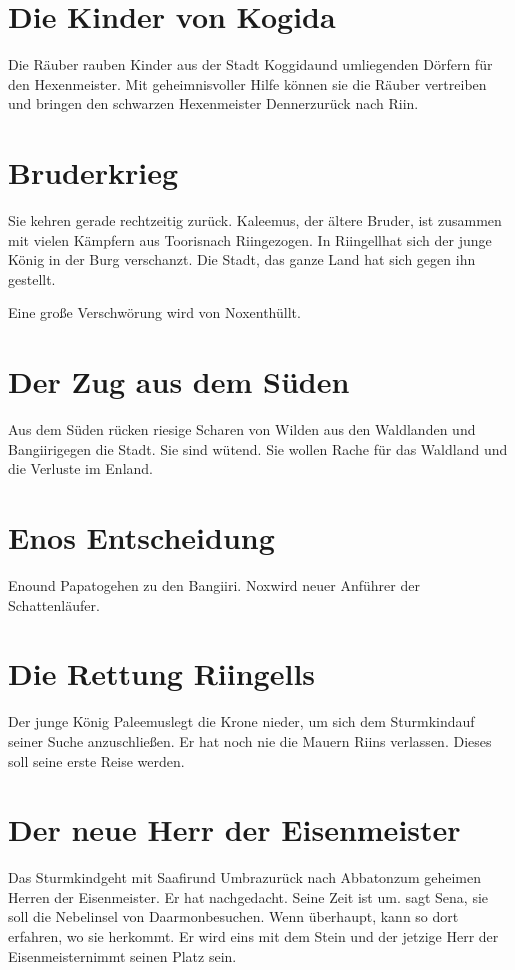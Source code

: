 \documentclass[12pt,a4paper,onecolumn,twoside,ngerman]{book}
\newcommand{\Sena}{Sena}
\newcommand{\Sturmkind}{Sturmkind}
\newcommand{\Bangiri}{Bangiiri}
\newcommand{\Papato}{Papato}
\newcommand{\Enland}{Enland}
\newcommand{\Schattenlaufer}{Schattenläufer}
\newcommand{\Eno}{Eno}
\newcommand{\Nox}{Nox}
\newcommand{\Umbra}{Umbra}
\newcommand{\Rhingell}{Riingell}
\newcommand{\Rhin}{Riin}
\newcommand{\Palemus}{Paleemus}
\newcommand{\Kalemus}{Kaleemus}
\newcommand{\Kogida}{Koggida}
\newcommand{\Denner}{Denner}
\newcommand{\Toris}{Tooris}
\newcommand{\Darmon}{Daarmon}
\newcommand{\Eisenmeister}{Eisenmeister}
\newcommand{\Abaton}{Abbaton}
\newcommand{\Safir}{Saafir}
\begin{document}
\section{Die Kinder von Kogida}
Die Räuber rauben Kinder aus der Stadt \Kogida und umliegenden Dörfern für den Hexenmeister. Mit geheimnisvoller Hilfe können sie die Räuber vertreiben und bringen den schwarzen Hexenmeister \Denner zurück nach \Rhin .

\section{Bruderkrieg}
Sie kehren gerade rechtzeitig zurück. \Kalemus , der ältere Bruder, ist zusammen mit vielen Kämpfern aus \Toris nach \Rhin gezogen. In \Rhingell hat sich der junge König in der Burg verschanzt. Die Stadt, das ganze Land hat sich gegen ihn gestellt. 

Eine große Verschwörung wird von \Nox enthüllt.

\section{Der Zug aus dem Süden}
Aus dem Süden rücken riesige Scharen von Wilden aus den Waldlanden und \Bangiri gegen die Stadt. Sie sind wütend. Sie wollen Rache für das Waldland und die Verluste im \Enland .

\section{{\Eno}s Entscheidung}
\Eno und \Papato gehen zu den \Bangiri . \Nox wird neuer Anführer der \Schattenlaufer .

\section{Die Rettung \Rhingell{s}}
Der junge König \Palemus legt die Krone nieder, um sich dem \Sturmkind auf seiner Suche anzuschließen. Er hat noch nie die Mauern \Rhin{s} verlassen. Dieses soll seine erste Reise werden.

\section{Der neue Herr der \Eisenmeister}
Das \Sturmkind geht mit \Safir und \Umbra zurück nach \Abaton zum geheimen Herren der \Eisenmeister . Er hat nachgedacht. Seine Zeit ist um.  sagt \Sena , sie soll die Nebelinsel von \Darmon besuchen. Wenn überhaupt, kann so dort erfahren, wo sie herkommt. Er wird eins mit dem Stein und der jetzige Herr der \Eisenmeister nimmt seinen Platz sein.
\end{document}
